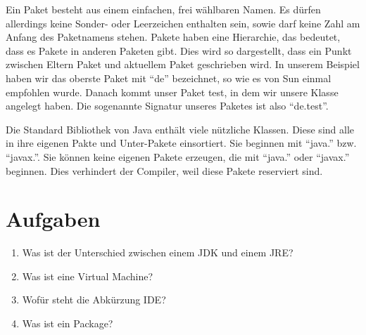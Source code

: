 Ein Paket besteht aus einem einfachen, frei wählbaren Namen. Es dürfen allerdings keine Sonder- oder Leerzeichen enthalten sein, sowie darf keine Zahl am Anfang des Paketnamens stehen. Pakete haben eine Hierarchie, das bedeutet, dass es Pakete in anderen Paketen gibt. Dies wird so dargestellt, dass ein Punkt zwischen Eltern Paket und aktuellem Paket geschrieben wird. In unserem Beispiel haben wir das oberste Paket mit "`de"' bezeichnet, so wie es von Sun einmal empfohlen wurde. Danach kommt unser Paket test, in dem wir unsere Klasse angelegt haben. Die sogenannte Signatur unseres Paketes ist also "`de.test"'. 

Die Standard Bibliothek von Java enthält viele nützliche Klassen. Diese sind alle in ihre eigenen Pakte und Unter-Pakete einsortiert. Sie beginnen mit "`java."' bzw. "`javax."'. Sie können keine eigenen Pakete erzeugen, die mit "`java."' oder "`javax."' beginnen. Dies verhindert der Compiler, weil diese Pakete reserviert sind.

\section{Aufgaben}
\begin{enumerate}
\item Was ist der Unterschied zwischen einem JDK und einem JRE?
\item Was ist eine Virtual Machine?
\item Wofür steht die Abkürzung IDE?
\item Was ist ein Package?
\end{enumerate}

